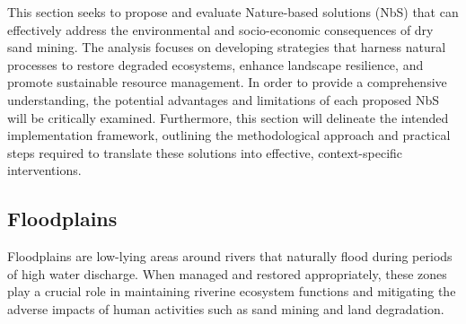 


This section seeks to propose and evaluate Nature-based solutions (NbS) that can effectively address the environmental and socio-economic consequences of dry sand mining. The analysis focuses on developing strategies that harness natural processes to restore degraded ecosystems, enhance landscape resilience, and promote sustainable resource management. In order to provide a comprehensive understanding, the potential advantages and limitations of each proposed NbS will be critically examined. Furthermore, this section will delineate the intended implementation framework, outlining the methodological approach and practical steps required to translate these solutions into effective, context-specific interventions.

\subsection{Floodplains}
Floodplains are low-lying areas around rivers that naturally flood during periods of high water discharge. When managed and restored appropriately, these zones play a crucial role in maintaining riverine ecosystem functions and mitigating the adverse impacts of human activities such as sand mining and land degradation.

